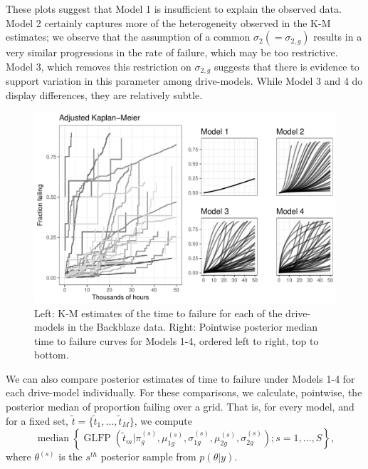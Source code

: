 \documentclass[12pt]{article}
\newcommand{\op}{\operatorname}
\begin{document}
These plots suggest that Model 1 is insufficient to explain the observed data. Model 2 certainly captures more of the heterogeneity observed in the K-M estimates; we observe that the assumption of a common $\sigma_2(=\sigma_{2,g})$ results in a very similar progressions in the rate of failure, which may be too restrictive. Model 3, which removes this restriction on $\sigma_{2,g}$ suggests that there is evidence to support variation in this parameter among drive-models. While Model 3 and 4 do display differences, they are relatively subtle.

\begin{figure}[H]
\includegraphics[width=\textwidth]{heterogeneity-compare}
\caption{Left: K-M estimates of the time to failure for each of the drive-models in the Backblaze data. Right: Pointwise posterior median time to failure curves for Models 1-4, ordered left to right, top to bottom.}
\label{fig:fig2}
\end{figure}

We can also compare posterior estimates of time to failure under Models 1-4 for each drive-model individually.  For these comparisons, we calculate, pointwise, the posterior median of proportion failing over a grid. That is, for every model, and for a fixed set, $\tilde{t}=\{\tilde{t}_1,\ldots,\tilde{t}_M\}$, we compute 
\begin{equation}
\label{pointwise-medians}
\op{median}\left\{\op{GLFP}\left(\tilde{t}_m|\pi_{g}^{(s)},\mu_{1g}^{(s)},\sigma_{1g}^{(s)},\mu_{2g}^{(s)},\sigma_{2g}^{(s)}\right);s=1,\ldots,S \right\},
\end{equation}
where $\theta^{(s)}$ is the $s^{th}$ posterior sample from $p(\theta|y)$.
\end{document}
